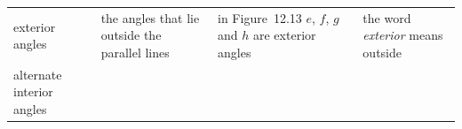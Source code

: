 \begin{center}
\begin{xtabular*}{\mytablewidth}[t]{|p{3cm}|p{3cm}|p{3cm}|p{20\mystarwidth}|}
    
     \tabularnewline{}
    
    
        exterior angles &
    
    
        the angles that lie outside the parallel lines &
    
    
        in Figure~12.13 \begin{math}e\end{math}, \begin{math}f\end{math}, \begin{math}g\end{math} and \begin{math}h\end{math} are exterior angles &
    
    
        the word \textsl{exterior} means outside%
     \tabularnewline{}
    
    
        alternate interior angles &
    

\end{xtabular*}
\end{center}
